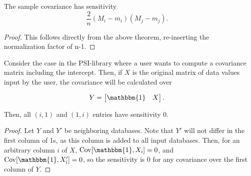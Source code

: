 \documentclass[11pt, oneside]{article}   	%
\begin{document}
\begin{corollary}
The sample covariance has sensitivity 
$$  \frac{2}{n}(M_i - m_i)(M_j - m_j).
 $$
\end{corollary}

\begin{proof}
This follows directly from the above theorem, re-inserting the normalization factor of n-1.
\end{proof}

\begin{theorem}
Consider the case in the PSI-library where a user wants to compute a covariance matrix including the intercept. Then, if $X$ is the original matrix of data values input by the user, the covariance will be calculated over 

$$
Y =
\begin{bmatrix}
\mathbbm{1} & X\\
\end{bmatrix}.
$$

Then, all $(i,1)$ and $(1,i)$ entries have sensitivity 0.
\end{theorem}

\begin{proof}

Let $Y$ and $Y'$ be neighboring databases. Note that $Y'$ will not differ in the first column of 1s, as this column is added to all input databases. Then, for an arbitrary column $i$ of $X$,
$\cov[\mathbbm{1},X_i] = 0$, and $\cov[\mathbbm{1},X_i'] = 0$, so the sensitivity is 0 for any covariance over the first column of $Y$.
\end{proof}
\end{document}
